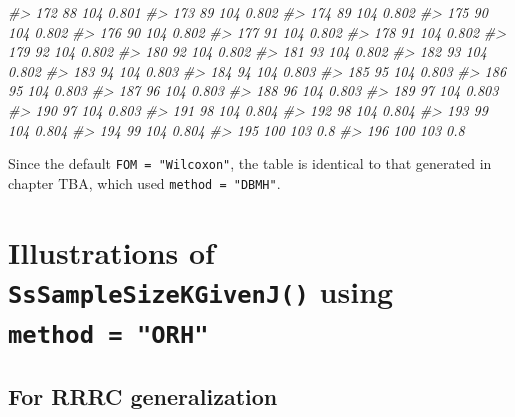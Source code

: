 \documentclass[
]{book}
\newenvironment{Shaded}{\begin{snugshade}}{\end{snugshade}}
\newcommand{\CommentTok}[1]{\textcolor[rgb]{0.56,0.35,0.01}{\textit{#1}}}
\begin{document}
\begin{Shaded}
\begin{Highlighting}[]
\CommentTok{\#\textgreater{} 172         88      104 0.801}
\CommentTok{\#\textgreater{} 173         89      104 0.802}
\CommentTok{\#\textgreater{} 174         89      104 0.802}
\CommentTok{\#\textgreater{} 175         90      104 0.802}
\CommentTok{\#\textgreater{} 176         90      104 0.802}
\CommentTok{\#\textgreater{} 177         91      104 0.802}
\CommentTok{\#\textgreater{} 178         91      104 0.802}
\CommentTok{\#\textgreater{} 179         92      104 0.802}
\CommentTok{\#\textgreater{} 180         92      104 0.802}
\CommentTok{\#\textgreater{} 181         93      104 0.802}
\CommentTok{\#\textgreater{} 182         93      104 0.802}
\CommentTok{\#\textgreater{} 183         94      104 0.803}
\CommentTok{\#\textgreater{} 184         94      104 0.803}
\CommentTok{\#\textgreater{} 185         95      104 0.803}
\CommentTok{\#\textgreater{} 186         95      104 0.803}
\CommentTok{\#\textgreater{} 187         96      104 0.803}
\CommentTok{\#\textgreater{} 188         96      104 0.803}
\CommentTok{\#\textgreater{} 189         97      104 0.803}
\CommentTok{\#\textgreater{} 190         97      104 0.803}
\CommentTok{\#\textgreater{} 191         98      104 0.804}
\CommentTok{\#\textgreater{} 192         98      104 0.804}
\CommentTok{\#\textgreater{} 193         99      104 0.804}
\CommentTok{\#\textgreater{} 194         99      104 0.804}
\CommentTok{\#\textgreater{} 195        100      103   0.8}
\CommentTok{\#\textgreater{} 196        100      103   0.8}
\end{Highlighting}
\end{Shaded}

Since the default \texttt{FOM\ =\ "Wilcoxon"}, the table is identical to that generated in chapter TBA, which used \texttt{method\ =\ "DBMH"}.

\hypertarget{illustrations-of-sssamplesizekgivenj-using-method-orh}{%
\section{\texorpdfstring{Illustrations of \texttt{SsSampleSizeKGivenJ()} using \texttt{method\ =\ "ORH"}}{Illustrations of SsSampleSizeKGivenJ() using method = "ORH"}}\label{illustrations-of-sssamplesizekgivenj-using-method-orh}}

\hypertarget{for-rrrc-generalization}{%
\subsection{For RRRC generalization}\label{for-rrrc-generalization}}
\end{document}
